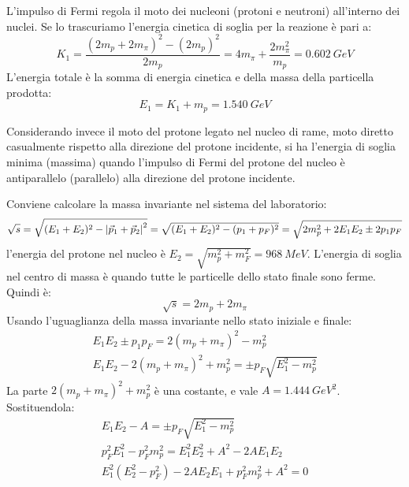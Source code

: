 \begin{Answer}
L'impulso di Fermi regola il moto dei nucleoni (protoni e neutroni)
all'interno dei nuclei. Se lo trascuriamo l’energia cinetica di soglia
per la reazione è pari a:
\begin{equation*}
K_1 = \frac{(2m_p + 2m_\pi)^2-(2m_p)^2}{2m_p} = 4m_\pi + \frac{2m_\pi^2}{m_p} = \SI{0.602}{GeV}
\end{equation*}
L'energia totale \`e la somma di energia cinetica e della massa della particella prodotta:
\begin{equation*}
E_1 = K_1 + m_p = \SI{1.540}{GeV}
\end{equation*}

Considerando invece il moto del protone legato nel nucleo di rame,
moto diretto casualmente rispetto alla direzione del protone
incidente, si ha l’energia di soglia minima (massima) quando l’impulso
di Fermi del protone del nucleo è antiparallelo (parallelo) alla
direzione del protone incidente.

Conviene calcolare la massa invariante nel sistema del laboratorio:
\begin{equation*}
  \sqrt{s} = \sqrt{(E_1+E_2)^2-\abs{\vec p_1+\vec p_2}^2} = \sqrt{(E_1+E_2)^2-(p_1+p_F)^2} =
  \sqrt{2m_p^2 + 2E_1E_2 \pm 2p_1p_F}
\end{equation*}
l'energia del protone nel nucleo \`e $E_2 = \sqrt{m_p^2+m_F^2}=\SI{968}{MeV}$.
L'energia di soglia nel centro di massa \`e quando tutte le particelle dello stato finale sono ferme. Quindi \`e:
\begin{equation*}
\sqrt{s}= 2m_p+2m_\pi
\end{equation*}
Usando l'uguaglianza della massa invariante nello stato iniziale e finale:
\begin{eqnarray*}
  E_1E_2\pm p_1p_F = 2(m_p+m_\pi)^2-m_p^2 \\
  E_1E_2 - 2(m_p+m_\pi)^2 + m_p^2 = \pm p_F\sqrt{E_1^2-m_p^2}
\end{eqnarray*}
La parte $2(m_p+m_\pi)^2 + m_p^2$ \`e una costante, e vale $A=\SI{1.444}{GeV^2}$. Sostituendola:
\begin{eqnarray*}
  E_1E_2 - A =  \pm p_F\sqrt{E_1^2-m_p^2} \\
  p_F^2E_1^2 - p_F^2m_p^2 = E_1^2E_2^2 + A^2-2AE_1E_2 \\
  E_1^2(E_2^2-p_F^2) - 2AE_2E_1 + p_F^2m_p^2 + A^2=0
\end{eqnarray*}


\end{Answer}
